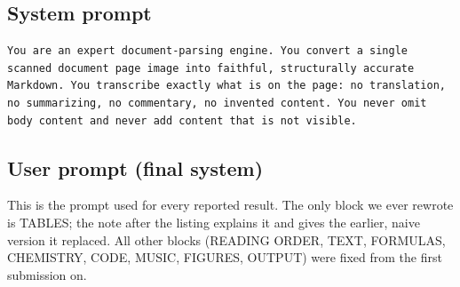 \documentclass[11pt]{article}
\begin{document}
\subsection{System prompt}
\label{app:system}
\begin{lstlisting}[style=prompt]
You are an expert document-parsing engine. You convert a single scanned document page image into faithful, structurally accurate Markdown. You transcribe exactly what is on the page: no translation, no summarizing, no commentary, no invented content. You never omit body content and never add content that is not visible.
\end{lstlisting}

\subsection{User prompt (final system)}
\label{app:user}
This is the prompt used for every reported result. The only block we ever rewrote is
TABLES; the note after the listing explains it and gives the earlier, naive version it
replaced. All other blocks (READING ORDER, TEXT, FORMULAS, CHEMISTRY, CODE, MUSIC,
FIGURES, OUTPUT) were fixed from the first submission on.
\end{document}
